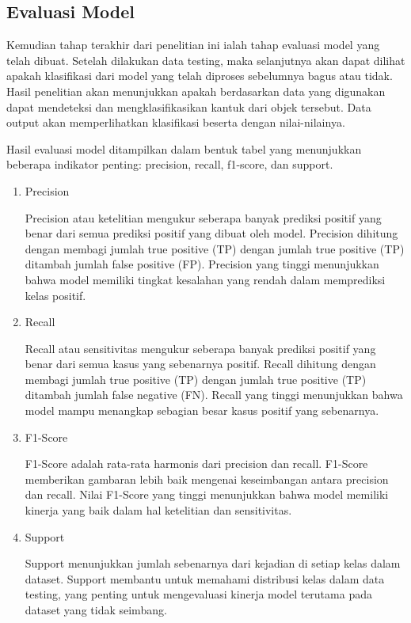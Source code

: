 \subsection{Evaluasi Model}
\label{subsec:evaluasi}

Kemudian tahap terakhir dari penelitian ini ialah tahap evaluasi model yang telah dibuat. Setelah dilakukan data testing, maka selanjutnya akan dapat dilihat apakah klasifikasi dari model yang telah diproses sebelumnya bagus atau tidak. Hasil penelitian akan menunjukkan apakah berdasarkan data yang digunakan dapat mendeteksi dan mengklasifikasikan kantuk dari objek tersebut. Data output akan memperlihatkan klasifikasi beserta dengan nilai-nilainya.

Hasil evaluasi model ditampilkan dalam bentuk tabel yang menunjukkan beberapa indikator penting: precision, recall, f1-score, dan support.

\begin{enumerate}

\item{Precision}

Precision atau ketelitian mengukur seberapa banyak prediksi positif yang benar dari semua prediksi positif yang dibuat oleh model. Precision dihitung dengan membagi jumlah true positive (TP) dengan jumlah true positive (TP) ditambah jumlah false positive (FP). Precision yang tinggi menunjukkan bahwa model memiliki tingkat kesalahan yang rendah dalam memprediksi kelas positif.

\item {Recall}

Recall atau sensitivitas mengukur seberapa banyak prediksi positif yang benar dari semua kasus yang sebenarnya positif. Recall dihitung dengan membagi jumlah true positive (TP) dengan jumlah true positive (TP) ditambah jumlah false negative (FN). Recall yang tinggi menunjukkan bahwa model mampu menangkap sebagian besar kasus positif yang sebenarnya.

\item{F1-Score}

F1-Score adalah rata-rata harmonis dari precision dan recall. F1-Score memberikan gambaran lebih baik mengenai keseimbangan antara precision dan recall. Nilai F1-Score yang tinggi menunjukkan bahwa model memiliki kinerja yang baik dalam hal ketelitian dan sensitivitas.

\item{Support}

Support menunjukkan jumlah sebenarnya dari kejadian di setiap kelas dalam dataset. Support membantu untuk memahami distribusi kelas dalam data testing, yang penting untuk mengevaluasi kinerja model terutama pada dataset yang tidak seimbang.

\end{enumerate}

